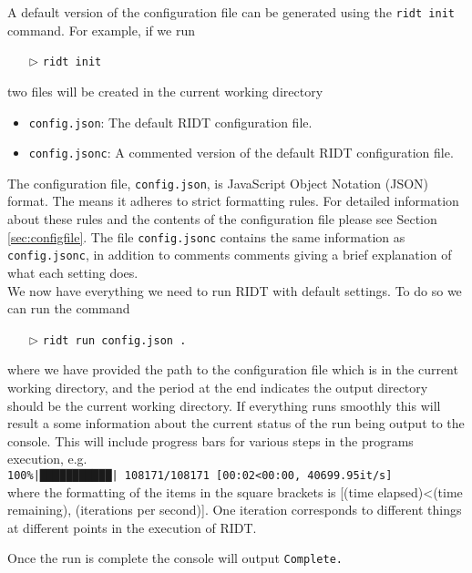 \documentclass[]{article}
\def\code#1{\texttt{#1}}
\begin{document}
\noindent A default version of the configuration file can be generated using the
\code{ridt init} command. For example, if we run
\begin{itemize}
    \item[$\triangleright$] \code{ridt init}
\end{itemize}
two files will be created in the current working directory
\begin{itemize}
    \item \code{config.json}: The default RIDT configuration file.
    \item \code{config.jsonc}: A commented version of the default RIDT
    configuration file.
\end{itemize}

\noindent The configuration file, \code{config.json}, is JavaScript Object
Notation (JSON) format. The means it adheres to strict formatting rules. For
detailed information about these rules and the contents of the configuration
file please see Section \ref{sec:configfile}. The file \code{config.jsonc}
contains the same information as \code{config.jsonc}, in addition to comments
comments giving a brief explanation of what each setting does.\\

\noindent We now have everything we need to run RIDT with default settings. To
do so we can run the command 
\begin{itemize}
    \item[$\triangleright$] \code{ridt run config.json .}
\end{itemize}

\noindent where we have provided the path to the configuration file which is in
the current working directory, and the period at the end indicates the output
directory should be the current working directory. If everything runs smoothly
this will result a some information about the current status of the run being
output to the console. This will include progress bars for various steps in the
programs execution, e.g.\\

\code{100\%|███████████| 108171/108171 [00:02<00:00,
40699.95it/s]}\\

\noindent where the formatting of the items in the square brackets is [(time
elapsed)<(time remaining), (iterations per second)]. One iteration corresponds
to different things at different points in the execution of RIDT.

Once the run is complete the console will output
\code{Complete.}\\
\end{document}
